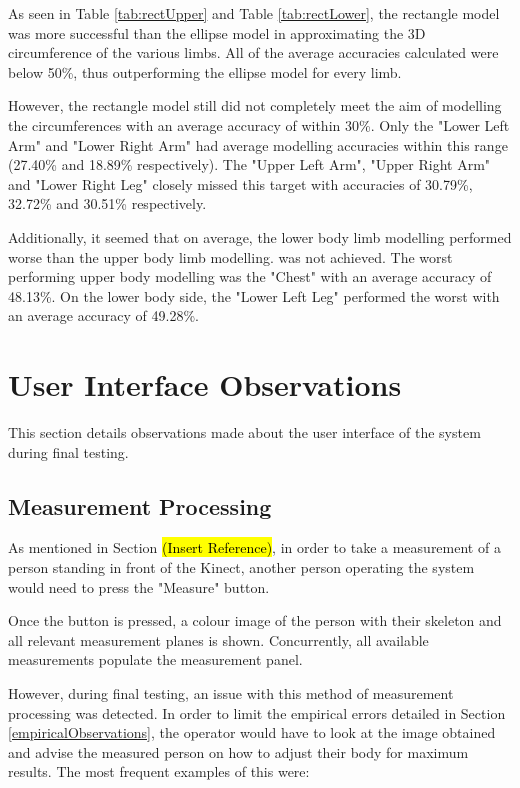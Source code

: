 As seen in Table \ref{tab:rectUpper} and Table \ref{tab:rectLower}, the rectangle model was more successful than the ellipse model in approximating the 3D circumference of the various limbs. All of the average accuracies calculated were below 50\%, thus outperforming the ellipse model for every limb.

However, the rectangle model still did not completely meet the aim of modelling the circumferences with an average accuracy of within 30\%. Only the "Lower Left Arm" and "Lower Right Arm" had average modelling accuracies within this range (27.40\% and 18.89\% respectively). The "Upper Left Arm", "Upper Right Arm" and "Lower Right Leg" closely missed this target with accuracies of 30.79\%, 32.72\% and 30.51\% respectively.

Additionally, it seemed that on average, the lower body limb modelling performed worse than the upper body limb modelling.    was not achieved. The worst performing upper body modelling was the "Chest" with an average accuracy of 48.13\%. On the lower body side, the "Lower Left Leg" performed the worst with an average accuracy of 49.28\%.

\section{User Interface Observations} \label{UIObservations}
This section details observations made about the user interface of the system during final testing. 

\subsection{Measurement Processing} \label{measurementProcess}
As mentioned in Section \hl{(Insert Reference)}, in order to take a measurement of a person standing in front of the Kinect, another person operating the system would need to press the "Measure" button.

Once the button is pressed, a colour image of the person with their skeleton and all relevant measurement planes is shown. Concurrently, all available measurements populate the measurement panel. 

However, during final testing, an issue with this method of measurement processing was detected. In order to limit the empirical errors detailed in Section \ref{empiricalObservations}, the operator would have to look at the image obtained and advise the measured person on how to adjust their body for maximum results. The most frequent examples of this were:


